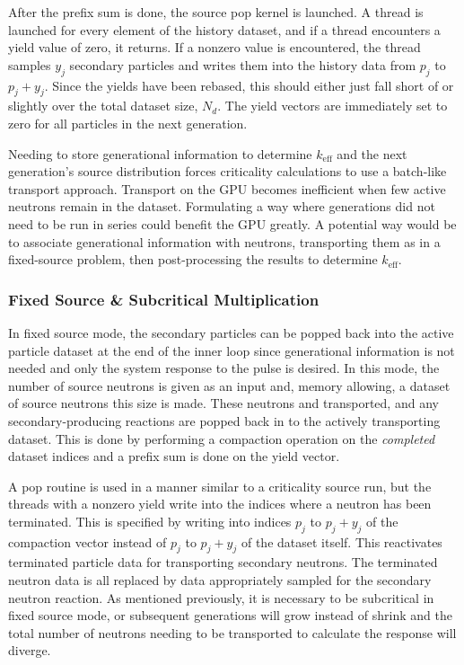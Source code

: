 After the prefix sum is done, the source pop kernel is launched.  A thread is launched for every element of the history dataset, and if a thread encounters a yield value of zero, it returns.  If a nonzero value is encountered, the thread samples $y_j$ secondary particles and writes them into the history data from $p_j$ to $p_j+y_j$.  Since the yields have been rebased, this should either just fall short of or slightly over the total dataset size, $N_d$.  The yield vectors are immediately set to zero for all particles in the next generation.

Needing to store generational information to determine $k_\mathrm{eff}$ and the next generation's source distribution forces criticality calculations to use a batch-like transport approach.  Transport on the GPU becomes inefficient when few active neutrons remain in the dataset.  Formulating a way where generations did not need to be run in series could benefit the GPU greatly.  A potential way would be to associate generational information with neutrons, transporting them as in a fixed-source problem, then post-processing the results to determine $k_\mathrm{eff}$. 

\subsubsection{Fixed Source \& Subcritical Multiplication}

In fixed source mode, the secondary particles can be popped back into the active particle dataset at the end of the inner loop since generational information is not needed and only the system response to the pulse is desired. %
 In this mode, the number of source neutrons is given as an input and, memory allowing, a dataset of source neutrons this size is made.  These neutrons and transported, and any secondary-producing reactions are popped back in to the actively transporting dataset.  This is done by performing a compaction operation on the \emph{completed} dataset indices and a prefix sum is done on the yield vector.  
 
A pop routine is used in a manner similar to a criticality source run, but the threads with a nonzero yield write into the indices where a neutron has been terminated. This is specified by writing into indices $p_j$ to $p_j+y_j$ of the compaction vector instead of $p_j$ to $p_j+y_j$ of the dataset itself.  This reactivates terminated particle data for transporting secondary neutrons.  The terminated neutron data is all replaced by data appropriately sampled for the secondary neutron reaction.  As mentioned previously, it is necessary to be subcritical in fixed source mode, or subsequent generations will grow instead of shrink and the total number of neutrons needing to be transported to calculate the response will diverge.

